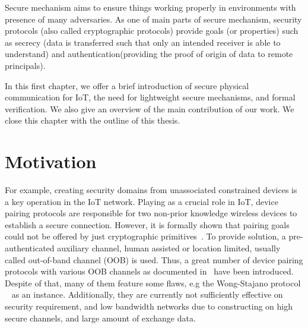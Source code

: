 Secure mechanism aims to ensure things working properly in environments with presence of many adversaries. As one of main parts of secure mechanism, security protocols (also called cryptographic protocols) provide goals (or properties) such as secrecy (data is transferred such that only an intended receiver is able to understand) and authentication(providing the proof of origin of data to remote principals). 

In this first chapter, we offer a brief introduction of secure physical communication for IoT, the need for lightweight secure mechanisms, and formal verification. We also give an overview of the main contribution of our work. We close this chapter with the outline of this thesis. 

\section{Motivation}


For example, creating security domains from unassociated constrained devices is a key operation in the IoT network. Playing as a crucial role in IoT, device pairing protocols are responsible for two non-prior knowledge wireless devices to establish a secure connection. However, it is formally shown that pairing goals could not be offered by just cryptographic primitives~\cite{Burrows90alogic}. To provide solution, a pre-authenticated auxiliary channel, human assisted or location limited, usually called out-of-band channel (OOB) is used. Thus, a great number of device pairing protocols with various OOB channels as documented in~\cite{6687314} have been introduced. Despite of that, many of them feature some flaws, e.g the Wong-Stajano protocol ~\cite{10.1109/MPRV.2007.76} as an instance. Additionally, they are currently not sufficiently effective on security requirement, and low bandwidth networks due to constructing on high secure channels, and large amount of exchange data. 

